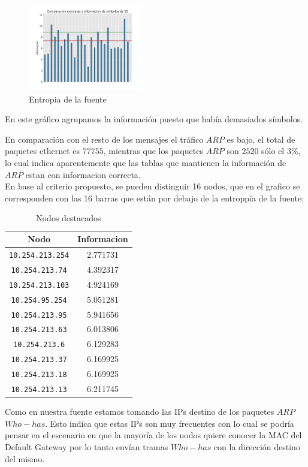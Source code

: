 \begin{figure}[h]
  \centering
    \includegraphics[width=0.45\textwidth]{entropia_red_despegar.png}
  \caption{Entropia de la fuente}
  \label{entropia-s1}
\end{figure}
En este gráfico agrupamos la información puesto que había demasiados símbolos.

En comparación con el resto de los mensajes el tráfico $ARP$ es bajo, el total de paquetes ethernet es $77755$, mientras que los paquetes $ARP$ son $2520$ sólo el 3\%, lo cual indica aparentemente que las tablas que mantienen la información de $ARP$ estan con informacion correcta. 
\\En base al criterio propuesto, se pueden distinguir 16 nodos, que en el grafico se corresponden con las 16 barras que están por debajo de la entroppía de la fuente:   

    \begin{table}[ht]\begin{center}
      \begin{tabular}{|c|c|}
      \hline
      \textbf{Nodo} & \textbf{Informacion} \\ \hline
      \texttt{10.254.213.254}&2.771731\\ \hline
      \texttt{10.254.213.74}&4.392317\\ \hline
      \texttt{10.254.213.103}&4.924169\\ \hline
      \texttt{10.254.95.254}&5.051281 \\ \hline
      \texttt{10.254.213.95}&5.941656 \\ \hline
      \texttt{10.254.213.63}&6.013806 \\ \hline
      \texttt{10.254.213.6}&6.129283 \\ \hline
      \texttt{10.254.213.37}&6.169925 \\ \hline
      \texttt{10.254.213.18}&6.169925 \\ \hline
      \texttt{10.254.213.13}&6.211745 \\ \hline
      \end{tabular}
      \caption{Nodos destacados}
      \label{Nodos-destacados}
    \end{center}\end{table}

Como en nuestra fuente estamos tomando las IPs destino de los paquetes $ARP$ $Who-has$. Esto indíca que estas IPs son muy frecuentes con lo cual se podría pensar en el escenario en que la mayoría de los nodos quiere conocer la MAC del Default Gateway por lo tanto envían tramas $Who-has$ con la dirección destino del mismo.




